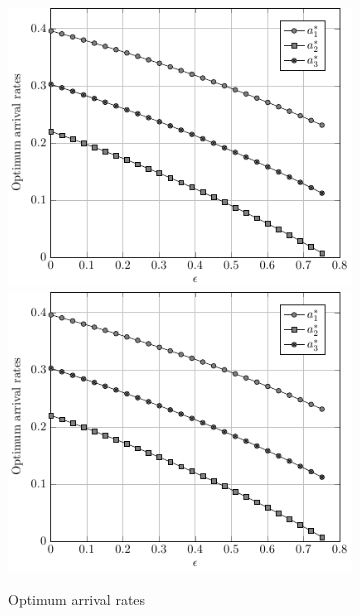 \begin{figure}
\centering
\begin{subfigure}[t]{.45\textwidth}
  \centering
    \if{}
        \includegraphics[width=\textwidth]{Figures/Ch7_Opt_a_eps.pdf}
    \else
        \includegraphics[draft,width=\textwidth]{Figures/Ch7_Opt_a_eps.pdf}
    \fi
    \caption{Optimum arrival rates}%
    \label{fig:Opt_a_eps}
\end{subfigure}%
\begin{subfigure}{.05\textwidth}
    \hspace{.05\textwidth}

\end{subfigure}
\end{figure}
